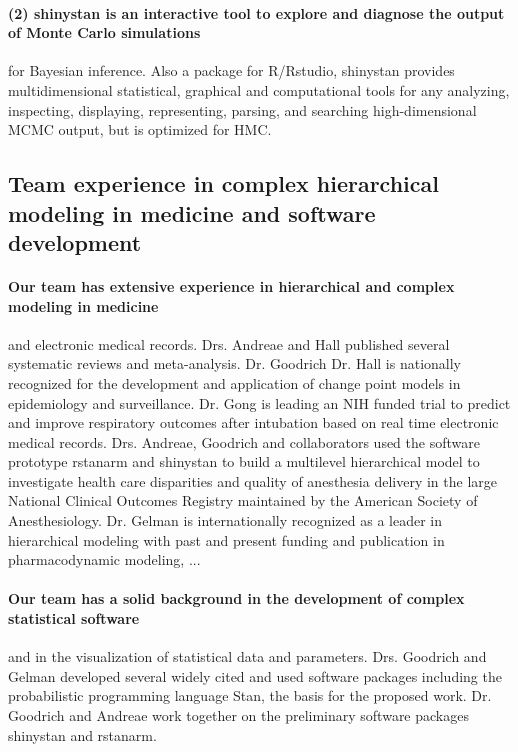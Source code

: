 \documentclass[11pt,notitlepage]{article}
\begin{document}
\paragraph*{(2) shinystan is an interactive tool to explore and diagnose the output of Monte Carlo simulations}for Bayesian inference.  Also a package for R/Rstudio, shinystan  provides multidimensional statistical, graphical and computational tools for any analyzing, inspecting, displaying, representing, parsing, and searching high-dimensional MCMC output, but is optimized for HMC.

\subsection*{Team experience in complex hierarchical modeling in medicine and software development}

\paragraph*{Our team has extensive experience in hierarchical and complex modeling in medicine} and electronic medical records. Drs. Andreae and Hall published several systematic reviews and meta-analysis. Dr. Goodrich Dr. Hall is nationally recognized for the development and application of change point models in epidemiology and surveillance. Dr. Gong is leading an NIH funded trial to predict and improve respiratory outcomes after intubation based on real time electronic medical records.  Drs. Andreae, Goodrich and collaborators used the software prototype rstanarm and shinystan to build a multilevel hierarchical model to investigate health care disparities and quality of anesthesia delivery in the large National Clinical Outcomes Registry maintained by the American Society of Anesthesiology. Dr. Gelman is internationally recognized as a leader in hierarchical modeling with past and present funding and publication in pharmacodynamic modeling, ...

\paragraph*{Our team has a solid background in the development of complex statistical software} and in the visualization of statistical data and parameters.  Drs. Goodrich and Gelman developed several widely cited and used software packages including the probabilistic programming language Stan, the basis for the proposed work. Dr. Goodrich and Andreae work together on the preliminary software packages shinystan and rstanarm.  
\end{document}
